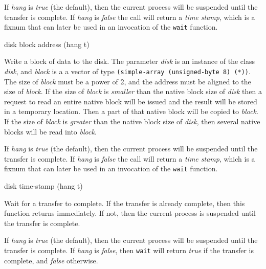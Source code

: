 If \textit{hang} is \emph{true} (the default), then the current
process will be suspended until the transfer is complete.
If \textit{hang} is \emph{false} the call will return a \emph{time
  stamp}, which is a fixnum that can later be used in an invocation of
the \texttt{wait} function.

 {disk block address \key (hang t)}

Write a block of data to the disk.  The parameter \textit{disk} is an
instance of the class \textit{disk}, and \textit{block} is a a vector
of type \texttt{(simple-array (unsigned-byte 8) (*))}.  The size of
\textit{block} must be a power of 2, and the address must be aligned
to the size of \textit{block}.  If the size of \textit{block} is
\emph{smaller} than the native block size of \textit{disk} then a
request to read an entire native block will be issued and the result
will be stored in a temporary location.  Then a part of that native
block will be copied to \textit{block}.  If the size of \textit{block}
is \emph{greater} than the native block size of \textit{disk}, then
several native blocks will be read into \textit{block}.

If \textit{hang} is \emph{true} (the default), then the current
process will be suspended until the transfer is complete.
If \textit{hang} is \emph{false} the call will return a \emph{time
  stamp}, which is a fixnum that can later be used in an invocation of
the \texttt{wait} function.

 {disk time-stamp \key (hang t)}

Wait for a transfer to complete.  If the transfer is already complete,
then this function returns immediately.  If not, then the current
process is suspended until the transfer is complete. 

If \textit{hang} is \emph{true} (the default), then the current
process will be suspended until the transfer is complete.
If \textit{hang} is \emph{false}, then \texttt{wait} will return
\emph{true} if the transfer is complete, and \emph{false} otherwise. 
